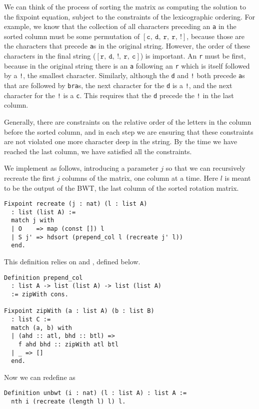 \documentclass[sigplan,10pt,anonymous,review]{thesis}
\begin{document}
We can think of the process of sorting the matrix as computing the
solution to the fixpoint equation, subject to the constraints of the
lexicographic ordering. For example, we know that the collection of
all characters preceding an \texttt{a} in the sorted column must be
some permutation of
$[\texttt{c},~\texttt{d},~\texttt{r},~\texttt{r},~\texttt{!}]$,
because those are the characters that precede \texttt{a}s in the
original string. However, the order of these characters in the final
string
($[\texttt{r},~\texttt{d},~\texttt{!},~\texttt{r},~\texttt{c}]$) is
important. An \texttt{r} must be first, because in the original string
there is an \texttt{a} following an \texttt{r} which is itself
followed by a \texttt{!}, the smallest character. Similarly, although
the \texttt{d} and \texttt{!} both precede \texttt{a}s that are
followed by \texttt{bra}s, the next character for the \texttt{d} is a
\texttt{!}, and the next character for the \texttt{!} is a \texttt{c}.
This requires that the \texttt{d} precede the \texttt{!} in the last
column.

Generally, there are constraints on the relative order of the letters
in the column before the sorted column, and in each step we are
ensuring that these constraints are not violated one more character
deep in the string. By the time we have reached the last column, we
have satisfied all the constraints.

We implement  as follows, introducing a parameter $j$ so
that we can recursively recreate the first $j$ columns of the matrix,
one column at a time. Here $l$ is meant to be the output of the BWT,
the last column of the sorted rotation matrix.
\begin{lstlisting}
Fixpoint recreate (j : nat) (l : list A)
  : list (list A) :=
  match j with
  | O    => map (const []) l
  | S j' => hdsort (prepend_col l (recreate j' l))
  end.
\end{lstlisting}
This definition relies on  and , defined below.
\begin{lstlisting}
Definition prepend_col
  : list A -> list (list A) -> list (list A)
  := zipWith cons.

Fixpoint zipWith (a : list A) (b : list B)
  : list C :=
  match (a, b) with
  | (ahd :: atl, bhd :: btl) =>
    f ahd bhd :: zipWith atl btl
  | _ => []
  end.
\end{lstlisting}

Now we can redefine  as
\begin{lstlisting}
Definition unbwt (i : nat) (l : list A) : list A :=
  nth i (recreate (length l) l) l.
\end{lstlisting}
\end{document}
